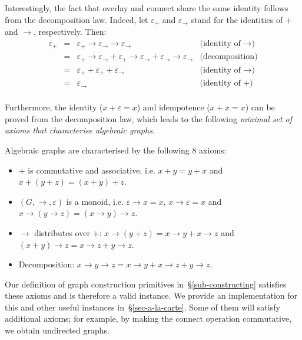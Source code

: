 Interestingly, the fact that overlay and connect share the same identity
follows from the decomposition law. Indeed, let $\varepsilon_{+}$ and
$\varepsilon_{\rightarrow}$ stand for the identities of $+$ and $\rightarrow$,
respectively. Then:
\[
\begin{array}{rcll}
\varepsilon_{+} & = & \varepsilon_{+} \rightarrow \varepsilon_{\rightarrow} \rightarrow \varepsilon_{\rightarrow} & \text{(identity of $\rightarrow$)}\\
 & = & \varepsilon_{+} \rightarrow \varepsilon_{\rightarrow} + \varepsilon_{+} \rightarrow \varepsilon_{\rightarrow} + \varepsilon_{\rightarrow} \rightarrow \varepsilon_{\rightarrow} & \text{(decomposition)}\\
 & = & \varepsilon_{+} + \varepsilon_{+} + \varepsilon_{\rightarrow} & \text{(identity of $\rightarrow$)}\\
 & = & \varepsilon_{\rightarrow} & \text{(identity of $+$)}\\
\end{array}
\]

\noindent
Furthermore, the identity ($x + \varepsilon = x$) and idempotence ($x + x = x$) can be proved
from the decomposition law, which leads to the following \emph{minimal set of axioms that
characterise algebraic graphs}.

Algebraic graphs are characterised by the following 8 axioms:
\begin{itemize}
    \item $+$ is commutative and associative, i.e. $x + y = y + x$ and
    $x + (y + z) = (x + y) + z$.
    \item $(G, \rightarrow, \varepsilon)$ is a monoid, i.e.
    $\varepsilon \rightarrow x = x$, $x \rightarrow \varepsilon = x$ and
    $x \rightarrow (y \rightarrow z) = (x \rightarrow y) \rightarrow z$.
    \item $\rightarrow$ distributes over $+$:
    $x \rightarrow (y + z) = x \rightarrow y + x \rightarrow z$ and
    $(x + y) \rightarrow z = x \rightarrow z + y \rightarrow z$.
    \item Decomposition: $x \rightarrow y \rightarrow z =
    x \rightarrow y + x \rightarrow z + y \rightarrow z$.
\end{itemize}

Our definition of graph construction primitives in~\S\ref{sub-constructing} satisfies
these axioms and is therefore a valid  instance. We provide an
implementation for this and other useful instances in~\S\ref{sec-a-la-carte}.
Some of them will satisfy additional axioms; for example, by making the connect
operation commutative, we obtain undirected graphs.

